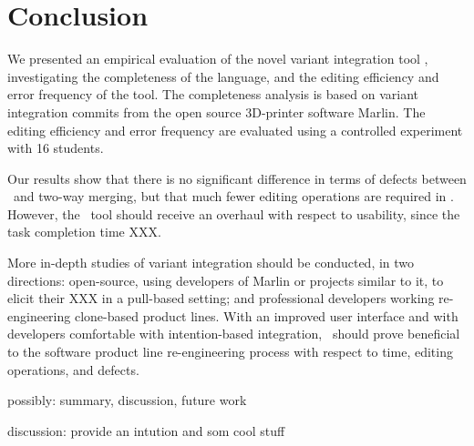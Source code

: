 \chapter{Conclusion}
We presented an empirical evaluation of the novel variant integration tool \tooln, investigating the completeness of the language, and the editing efficiency and error frequency of the tool. The completeness analysis is based on variant integration commits from the open source 3D-printer software Marlin. The editing efficiency and error frequency are evaluated using a controlled experiment with 16 students. 

Our results show that there is no significant difference in terms of defects between \tooln~and two-way merging, but that much fewer editing operations are required in \tooln. However, the \tooln~tool should receive an overhaul with respect to usability, since the task completion time XXX.

More in-depth studies of variant integration should be conducted, in two directions: open-source, using developers of Marlin or projects similar to it, to elicit their XXX in a pull-based setting; and professional developers working re-engineering clone-based product lines.
With an improved user interface and with developers comfortable with intention-based integration, \tooln~should prove beneficial to the software product line re-engineering process with respect to time, editing operations, and defects.




possibly: summary, discussion, future work

discussion: provide an intution and som cool stuff